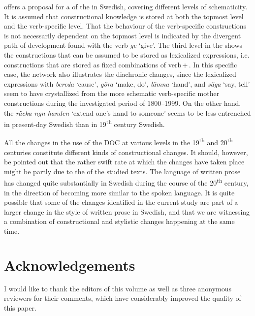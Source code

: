 \documentclass[output=paper]{langscibook}
\begin{document}
\begin{sloppypar}
 offers a proposal for a  of the  in Swedish, covering different levels of schematicity. It is assumed that constructional knowledge is stored at both the topmost level and the verb-specific level. That the behaviour of the verb-specific constructions is not necessarily dependent on the topmost level is indicated by the divergent path of development found with the verb \textit{ge} ‘give’. The third level in the  shows the constructions that can be assumed to be stored as lexicalized expressions, i.e. constructions that are stored as fixed combinations of verb\,+\,. In this specific case, the network also illustrates the diachronic changes, since the lexicalized expressions with \textit{bereda} ‘cause’, \textit{göra} ‘make, do’, \textit{lämna} ‘hand’, and \textit{säga} ‘say, tell’ seem to have crystallized from the more schematic verb-specific mother constructions during the investigated period of 1800–1999. On the other hand, the  \textit{räcka ngn handen} ‘extend one's hand to someone’ seems to be less entrenched in present-day Swedish than in 19\textsuperscript{th} century Swedish.
\end{sloppypar}


All the changes in the use of the DOC at various levels in the 19\textsuperscript{th} and 20\textsuperscript{th} centuries constitute different kinds of constructional changes. It should, however, be pointed out that the rather swift rate at which the changes have taken place might be partly due to the  of the studied texts. The language of written prose has changed quite substantially in Swedish during the course of the 20\textsuperscript{th} century, in the direction of becoming more similar to the spoken language. It is quite possible that some of the changes identified in the current study are part of a larger change in the style of written prose in Swedish, and that we are witnessing a combination of constructional and stylistic changes happening at the same time.


\section*{Acknowledgements}


I would like to thank the editors of this volume as well as three anonymous reviewers for their comments, which have considerably improved the quality of this paper.
\end{document}

